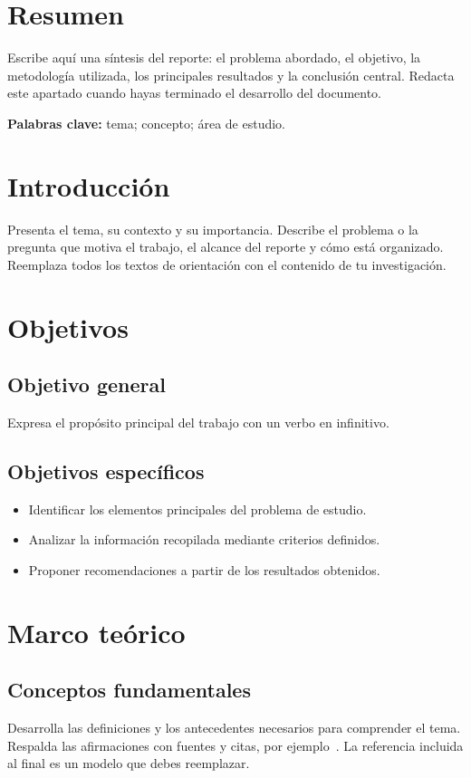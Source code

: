 \documentclass[12pt,letterpaper]{article}
\begin{document}
\portadareporte
{}
\section*{Resumen}
Escribe aquí una síntesis del reporte: el problema abordado, el objetivo,
la metodología utilizada, los principales resultados y la conclusión central.
Redacta este apartado cuando hayas terminado el desarrollo del documento.

\textbf{Palabras clave:} tema; concepto; área de estudio.
\clearpage
\tableofcontents
\clearpage
{}

\section{Introducción}
Presenta el tema, su contexto y su importancia. Describe el problema o la
pregunta que motiva el trabajo, el alcance del reporte y cómo está organizado.
Reemplaza todos los textos de orientación con el contenido de tu investigación.

\section{Objetivos}
\subsection{Objetivo general}
Expresa el propósito principal del trabajo con un verbo en infinitivo.
\subsection{Objetivos específicos}
\begin{itemize}
  \item Identificar los elementos principales del problema de estudio.
  \item Analizar la información recopilada mediante criterios definidos.
  \item Proponer recomendaciones a partir de los resultados obtenidos.
\end{itemize}

\section{Marco teórico}
\subsection{Conceptos fundamentales}
Desarrolla las definiciones y los antecedentes necesarios para comprender el
tema. Respalda las afirmaciones con fuentes y citas, por ejemplo~.
La referencia incluida al final es un modelo que debes reemplazar.
\end{document}

